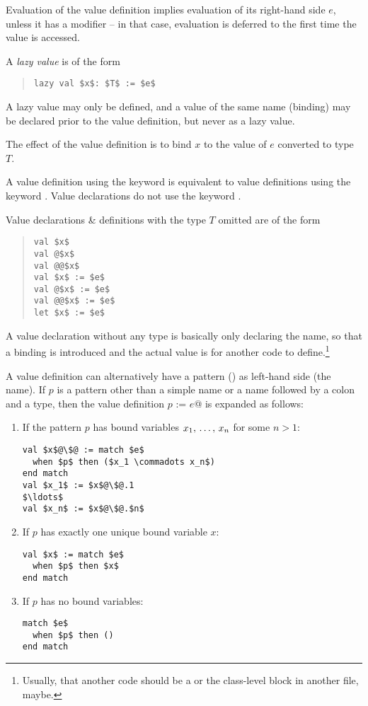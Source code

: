 Evaluation of the value definition implies evaluation of its right-hand side $e$, unless it has a modifier  -- in that case, evaluation is deferred to the first time the value is accessed. 

A {\em lazy value} is of the form
\begin{quote}\begin{lstlisting}
lazy val $x$: $T$ := $e$
\end{lstlisting}\end{quote}

A lazy value may only be defined, and a value of the same name (binding) may be declared prior to the value definition, but never as a lazy value. 

The effect of the value definition is to bind $x$ to the value of $e$ converted to type $T$. 

A value definition using the keyword  is equivalent to value definitions using the keyword . Value declarations do not use the keyword . 

Value declarations \& definitions with the type $T$ omitted are of the form
\begin{quote}\begin{lstlisting}
val $x$
val @$x$
val @@$x$
val $x$ := $e$
val @$x$ := $e$
val @@$x$ := $e$
let $x$ := $e$
\end{lstlisting}\end{quote}

A value declaration without any type is basically only declaring the name, so that a binding is introduced and the actual value is for another code to define.\footnote{Usually, that another code should be a  or the class-level block in another file, maybe.}

A value definition can alternatively have a pattern () as left-hand side (the name). If $p$ is a pattern other than a simple name or a name followed by a colon and a type, then the value definition \lstinline@val $p$ := $e$@ is expanded as follows: 

\begin{enumerate}
\item
If the pattern $p$ has bound variables $x_1 ,\, \ldots ,\, x_n$ for some $n > 1$:
\begin{lstlisting}[escapechar=@]
val $x$@\$@ := match $e$
  when $p$ then ($x_1 \commadots x_n$)
end match
val $x_1$ := $x$@\$@.1
$\ldots$
val $x_n$ := $x$@\$@.$n$
\end{lstlisting}

\item
If $p$ has exactly one unique bound variable $x$:
\begin{lstlisting}
val $x$ := match $e$
  when $p$ then $x$
end match
\end{lstlisting}

\item
If $p$ has no bound variables:
\begin{lstlisting}
match $e$
  when $p$ then ()
end match
\end{lstlisting}
\end{enumerate}

